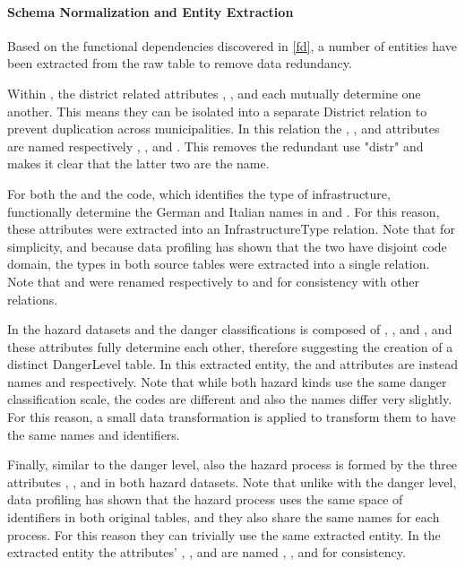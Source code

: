 \paragraph{Schema Normalization and Entity Extraction}

Based on the functional dependencies discovered in \cref{fd}, a number of entities have been extracted from the raw table to remove data redundancy.

Within , the district related attributes , , and  each mutually determine one another. This means they can be isolated into a separate District relation to prevent duplication across municipalities. In this relation the , , and  attributes are named respectively , , and . This removes the redundant use "distr" and makes it clear that the latter two are the name.

For both the  and  the code, which identifies the type of infrastructure, functionally determine the German and Italian names in  and . For this reason, these attributes were extracted into an InfrastructureType relation. Note that for simplicity, and because data profiling has shown that the two have disjoint code domain, the types in both source tables were extracted into a single relation. Note that  and  were renamed respectively to  and  for consistency with other relations.

In the hazard datasets  and  the danger classifications is composed of , , and , and these attributes fully determine each other, therefore suggesting the creation of a distinct DangerLevel table. In this extracted entity, the  and  attributes are instead names  and  respectively. Note that while both hazard kinds use the same danger classification scale, the codes are different and also the names differ very slightly. For this reason, a small data transformation is applied to transform them to have the same names and identifiers.

Finally, similar to the danger level, also the hazard process is formed by the three attributes , , and  in both hazard datasets. Note that unlike with the danger level, data profiling has shown that the hazard process uses the same space of identifiers in both original tables, and they also share the same names for each process. For this reason they can trivially use the same extracted entity. In the extracted entity the attributes' , , and  are named , , and  for consistency.


